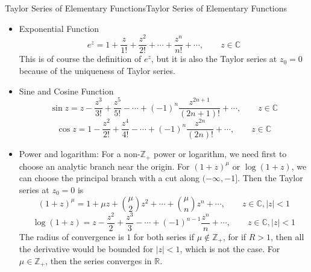 \documentclass[../main.tex]{subfiles}
\begin{document}
\begin{example}{Taylor Series of Elementary Functions}{Taylor Series of Elementary Functions}
	\begin{itemize}
	\item Exponential Function
		\begin{equation*}
			e^z = 1 + \frac{z}{1!} + \frac{z^2}{2!} + \cdots + \frac{z^n}{n!} + \cdots, \qquad z\in \mathbb{C}
		\end{equation*}
		This is of course the definition of $e^z$, but it is also the Taylor series at $z_0=0$ because of the uniqueness of Taylor series.
	\item Sine and Cosine Function
	\begin{equation*}
		\sin z = z - \frac{z^3}{3!} + \frac{z^5}{5!} - \cdots + (-1)^n \frac{z^{2n+1}}{(2n+1)!} + \cdots, \qquad z\in \mathbb{C}
	\end{equation*}
	\begin{equation*}
		\cos z = 1 - \frac{z^2}{2!} + \frac{z^4}{4!} - \cdots + (-1)^n \frac{z^{2n}}{(2n)!} + \cdots, \qquad z\in \mathbb{C}
	\end{equation*}
	\item Power and logarithm: For a non-$\mathbb{Z}_+$ power or logarithm, we need first to choose an analytic branch near the origin. For $(1+z)^{\mu}$ or $\log (1+z)$, we can choose the principal branch with a cut along $(-\infty ,-1]$. Then the Taylor series at $z_0=0$ is
	\begin{equation*}
		(1+z)^{\mu} = 1 + \mu z + \binom{\mu}{2} z^2 + \cdots + \binom{\mu}{n} z^n + \cdots, \qquad z\in \mathbb{C}, \left|z\right|<1
	\end{equation*}
	\begin{equation*}
		\log (1+z) = z - \frac{z^2}{2} + \frac{z^3}{3} - \cdots + (-1)^{n-1} \frac{z^n}{n} + \cdots, \qquad z\in \mathbb{C}, \left|z\right|<1
	\end{equation*}
	The radius of convergence is $1$ for both series if $\mu\notin \mathbb{Z}_+$, for if $R>1$, then all the derivative would be bounded for $\left|z\right|< 1$, which is not the case. For $\mu\in \mathbb{Z}_+$, then the series converges in $\mathbb{R}$.


\end{itemize}
\end{example}
\end{document}

